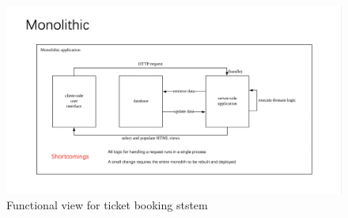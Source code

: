 \documentclass[12pt]{article}
\begin{document}
\pagestyle{empty}

\begin{figure}[H]
  \centering
	\includegraphics[width=0.8\linewidth]{page1.png}
	\caption{Functional view for ticket booking ststem}
\end{figure}
\end{document}
